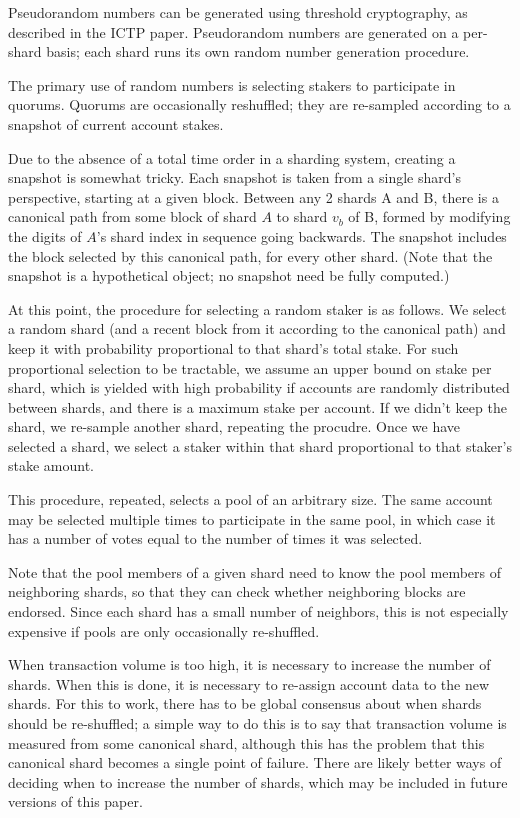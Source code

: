 \documentclass{article}
\begin{document}
Pseudorandom numbers can be generated using threshold cryptography, as
described in the ICTP paper.  Pseudorandom numbers are generated on a per-shard
basis; each shard runs its own random number generation procedure.

The primary use of random numbers is selecting stakers to participate in
quorums.  Quorums are occasionally reshuffled; they are re-sampled according to
a snapshot of current account stakes.

Due to the absence of a total time order in a sharding system, creating a
snapshot is somewhat tricky.  Each snapshot is taken from a single shard's
perspective, starting at a given block.  Between any 2 shards A and B, there
is a canonical path from some block of shard $A$ to shard $v_b$ of B, formed
by modifying the digits of $A$'s shard index in sequence going backwards.
The snapshot includes the block selected by this canonical path, for every
other shard.  (Note that the snapshot is a hypothetical object; no snapshot
need be fully computed.)

At this point, the procedure for selecting a random staker is as follows.  We
select a random shard (and a recent block from it according to the canonical
path) and keep it with probability proportional to that shard's total stake.
For such proportional selection to be tractable, we assume an upper bound on
stake per shard, which is yielded with high probability if accounts are
randomly distributed between shards, and there is a maximum stake per account.
If we didn't keep the shard, we re-sample another shard, repeating the
procudre.  Once we have selected a shard, we select a staker within that shard
proportional to that staker's stake amount.

This procedure, repeated, selects a pool of an arbitrary size.  The same account
may be selected multiple times to participate in the same pool, in which case it
has a number of votes equal to the number of times it was selected.

Note that the pool members of a given shard need to know the pool members of
neighboring shards, so that they can check whether neighboring blocks are
endorsed.  Since each shard has a small number of neighbors, this is
not especially expensive if pools are only occasionally re-shuffled.

When transaction volume is too high, it is necessary to increase the number of
shards.  When this is done, it is necessary to re-assign account data to the
new shards.  For this to work, there has to be global consensus about when
shards should be re-shuffled; a simple way to do this is to say that
transaction volume is measured from some canonical shard, although this
has the problem that this canonical shard becomes a single point of failure.
There are likely better ways of deciding when to increase the number of shards,
which may be included in future versions of this paper.
\end{document}
